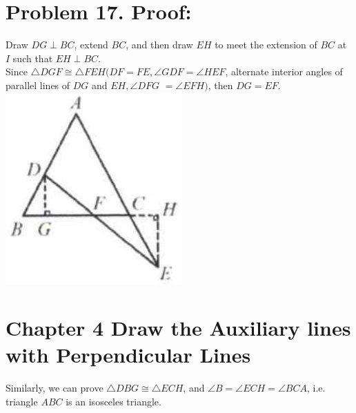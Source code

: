 \documentclass[10pt]{article}
\begin{document}
\section*{Problem 17. Proof:}
Draw \(D G \perp B C\), extend \(B C\), and then draw \(E H\) to meet the extension of \(B C\) at \(I\) such that \(E H \perp B C\).\\
Since \(\triangle D G F \cong \triangle F E H(D F=F E, \angle G D F=\angle H E F\), alternate interior angles of parallel lines of \(D G\) and \(E H, \angle D F G\) \(=\angle E F H)\), then \(D G=E F\).\\
\includegraphics[max width=\textwidth, center]{2025_04_17_97bc1f7e44d93c271a88g-098(2)}

\section*{Chapter 4 Draw the Auxiliary lines with Perpendicular Lines}
Similarly, we can prove \(\triangle D B G \cong \triangle E C H\), and \(\angle B=\angle E C H=\angle B C A\), i.e. triangle \(A B C\) is an isosceles triangle.
\end{document}
